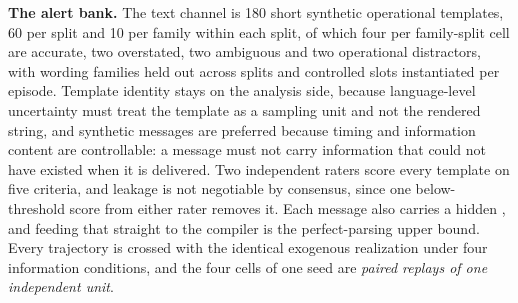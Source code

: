 \textbf{The alert bank.} The text channel is 180 short synthetic operational
templates, 60 per split and 10 per family within each split, of which four per
family-split cell are accurate, two overstated, two ambiguous and two operational
distractors, with wording families held out across splits and controlled slots
instantiated per episode. Template identity stays on the analysis side, because
language-level uncertainty must treat the template as a sampling unit and not the
rendered string, and synthetic messages are preferred because timing and
information content are controllable: a message must not carry information that
could not have existed when it is delivered. Two independent raters score every
template on five criteria, and leakage is not negotiable by consensus, since one
below-threshold score from either rater removes it.  Each message also carries a hidden
\alertspec{}, and feeding that straight to the compiler is the perfect-parsing
upper bound. Every trajectory is crossed with the identical exogenous realization
under four information conditions, and the four cells of one seed are
\emph{paired replays of one independent unit}.
